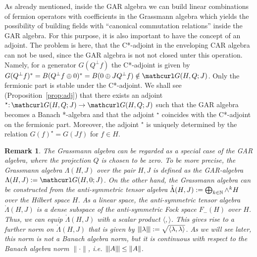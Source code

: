 \documentclass[pra,twoside,amsmath,amsfonts,amssymb,superscriptaddress,showpacs]{revtex4}
\newtheorem{rem}[thm]{Remark}
\def\7#1{{\Bbb #1}}
\def\9#1{{\mathcurl #1}}
\newcommand{\AFOCK}[1]{F_-(#1)}
\newcommand{\SPROD}[2]{\langle{#1},{#2}\rangle}
\newcommand{\GR}[2]{\Lambda(#1,#2)}
\newcommand{\GAR}[3]{\9G(#1,#3;#2)}
\newcommand{\ATEN}[2]{\mathring{\Lambda}(#1,#2)}
\newcommand{\HNO}[1]{\|\hspace{-1pt}| #1 \|\hspace{-1pt}|}
\newcommand{\ADJ}{\star}
\begin{document}
As already mentioned, inside the GAR algebra we can build linear combinations of fermion operators
with coefficients in the Grassmann algebra which yields the possibility of building fields
with ``canonical commutation relations'' inside the GAR algebra. For this purpose, it is also
important to have the concept of an adjoint. The problem is here, that the C*-adjoint in
the enveloping CAR algebra can not be used, since the GAR algebra is not not closed unter this
operation. Namely, for a generator $G(Q^\perp f)$ the C*-adjoint is given by $G(Q^\perp
f)^*=B(Q^\perp f\oplus 0)^*=B(0\oplus JQ^\perp f)\notin
\GAR{H}{J}{Q}$. Only the fermionic part is stable under the C*-adjoint. We shall see
(Proposition~\ref{prop:adj}) that there exists an adjoint
$^\ADJ\mathpunct:\GAR{H}{J}{Q}\to\GAR{H}{J}{Q}$ such that the GAR algebra
becomes a Banach *-algebra and that the adjoint $^\ADJ$ coincides with the C*-adjoint on the
fermionic part. Moreover, the adjoint $^\ADJ$ is uniquely determined by the relation
$G(f)^\ADJ=G(Jf)$ for $f\in H$.

\begin{rem}\em
The Grassmann algebra can be regarded as a special case of the GAR algebra, where the projection
$Q$ is chosen to be zero. To be more precise, the {\em Grassmann algebra} $\GR{H}{J}$ over the pair
$H,J$ is defined as the GAR-algebra $\GR{H}{J}:=\GAR{H}{J}{0}$. On the other hand, the Grassmann
algebra can be constructed from the anti-symmetric tensor algebra
$\ATEN{H}{J}:=\bigoplus_{k\in\7N}\wedge^k H$ over the Hilbert space $H$. As a linear space, the
anti-symmetric tensor algebra $\ATEN{H}{J}$ is a dense subspace of the
anti-symmetric Fock space $\AFOCK{H}$ over $H$. Thus, we can equip $\ATEN{H}{J}$ with a scalar
product $\SPROD{}{}$. This gives rise to a further norm on $\ATEN{H}{J}$ that is given by 
$\HNO{\lambda}:=\sqrt{\SPROD{\lambda}{\lambda}}$. As we will see later, this norm is
{\em not} a Banach algebra norm, but it is continuous with respect to the Banach algebra norm
$\|\cdot\|$, i.e. $\HNO{A}\leq \|A\|$.
\end{rem}
\end{document}
